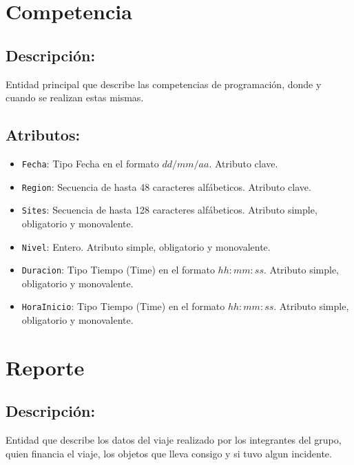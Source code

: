 \documentclass[doc, 12pt, donotrepeattitle]{apa6}
\begin{document}
\section*{Competencia}
\subsection*{Descripción:}
Entidad principal que describe las competencias de programación, donde y cuando se realizan estas mismas.

\subsection*{Atributos:}
\begin{itemize}
\item \texttt{Fecha}: Tipo Fecha en el formato $dd/mm/aa$. Atributo clave.
\item \texttt{Region}: Secuencia de hasta 48 caracteres alfábeticos. Atributo clave.
\item \texttt{Sites}: Secuencia de hasta 128 caracteres alfábeticos. Atributo simple, obligatorio y monovalente.
\item \texttt{Nivel}: Entero. Atributo simple, obligatorio y monovalente.
\item \texttt{Duracion}: Tipo Tiempo (Time) en el formato $hh:mm:ss$. Atributo simple, obligatorio y monovalente.
\item \texttt{HoraInicio}: Tipo Tiempo (Time) en el formato $hh:mm:ss$. Atributo simple, obligatorio y monovalente.
\end{itemize}

\newpage
\section*{Reporte}
\subsection*{Descripción:}
Entidad que describe los datos del viaje realizado por los integrantes del grupo, quien financia el viaje, los objetos que lleva consigo y si tuvo algun incidente.
\end{document}
